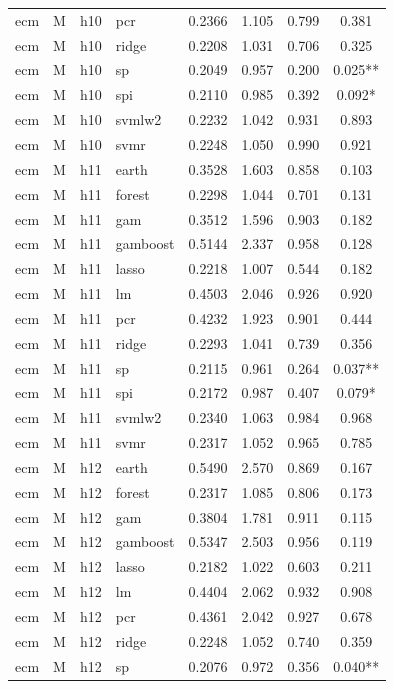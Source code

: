 \begin{ThreePartTable}
\begin{longtable}[t]{llclcccc}
ecm & M & h10 & pcr & 0.2366 & 1.105 & 0.799 & 0.381\\
ecm & M & h10 & ridge & 0.2208 & 1.031 & 0.706 & 0.325\\
ecm & M & h10 & sp & 0.2049 & 0.957 & 0.200 & 0.025**\\
ecm & M & h10 & spi & 0.2110 & 0.985 & 0.392 & 0.092*\\
ecm & M & h10 & svmlw2 & 0.2232 & 1.042 & 0.931 & 0.893\\
ecm & M & h10 & svmr & 0.2248 & 1.050 & 0.990 & 0.921\\
\addlinespace
ecm & M & h11 & earth & 0.3528 & 1.603 & 0.858 & 0.103\\
ecm & M & h11 & forest & 0.2298 & 1.044 & 0.701 & 0.131\\
ecm & M & h11 & gam & 0.3512 & 1.596 & 0.903 & 0.182\\
ecm & M & h11 & gamboost & 0.5144 & 2.337 & 0.958 & 0.128\\
ecm & M & h11 & lasso & 0.2218 & 1.007 & 0.544 & 0.182\\
ecm & M & h11 & lm & 0.4503 & 2.046 & 0.926 & 0.920\\
ecm & M & h11 & pcr & 0.4232 & 1.923 & 0.901 & 0.444\\
ecm & M & h11 & ridge & 0.2293 & 1.041 & 0.739 & 0.356\\
ecm & M & h11 & sp & 0.2115 & 0.961 & 0.264 & 0.037**\\
ecm & M & h11 & spi & 0.2172 & 0.987 & 0.407 & 0.079*\\
ecm & M & h11 & svmlw2 & 0.2340 & 1.063 & 0.984 & 0.968\\
ecm & M & h11 & svmr & 0.2317 & 1.052 & 0.965 & 0.785\\
\addlinespace
ecm & M & h12 & earth & 0.5490 & 2.570 & 0.869 & 0.167\\
ecm & M & h12 & forest & 0.2317 & 1.085 & 0.806 & 0.173\\
ecm & M & h12 & gam & 0.3804 & 1.781 & 0.911 & 0.115\\
ecm & M & h12 & gamboost & 0.5347 & 2.503 & 0.956 & 0.119\\
ecm & M & h12 & lasso & 0.2182 & 1.022 & 0.603 & 0.211\\
ecm & M & h12 & lm & 0.4404 & 2.062 & 0.932 & 0.908\\
ecm & M & h12 & pcr & 0.4361 & 2.042 & 0.927 & 0.678\\
ecm & M & h12 & ridge & 0.2248 & 1.052 & 0.740 & 0.359\\
ecm & M & h12 & sp & 0.2076 & 0.972 & 0.356 & 0.040**\\

\end{longtable}
\end{ThreePartTable}
